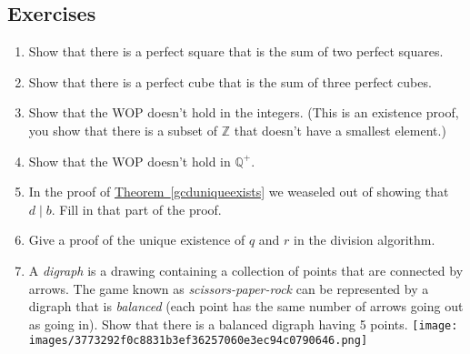 \documentclass[10pt,]{book}
\theoremstyle{plain}
\theoremstyle{definition}
\theoremstyle{definition}
\numberwithin{equation}{section}
\newcommand{\hint}[1]{ }
\newcommand{\divides}{\!\mid\!}
\newcommand{\Integers}{{\mathbb Z}}
\newcommand{\Rationals}{{\mathbb Q}}
\begin{document}
\subsection[{Exercises}]{Exercises}\label{exercises-20}
\leavevmode%
\begin{enumerate}[label=(\alph*)]
\item\hypertarget{li-286}{}
          Show that there is a perfect square that is the sum of two
          perfect squares.

          \hint{Can you say "Pythagorean triple"? I thought you could.}
\item\hypertarget{li-287}{}
          Show that there is a perfect cube that is the sum of three
          perfect cubes.

          \hint{Hint: \(6^3\) can be expressed as such a sum.}
\item\hypertarget{li-288}{}
          Show that the WOP doesn't hold in the integers.  (This is an
          existence proof, you show that there is a subset of \(\Integers\)
          that doesn't have a smallest element.)

          \hint{How about even integers? Is there a smallest one?  That's my example!  You come up with a 
          different one!}
\item\hypertarget{li-289}{}
          Show that the WOP doesn't hold in \(\Rationals^+\).

          \hint{Consider the set \(\{ 1, 1/2, 1/4, 1/8, \ldots \}\).  Does it have a smallest element?}
\item\hypertarget{li-290}{}
          In the proof of \hyperref[gcduniqueexists]{Theorem~\ref{gcduniqueexists}} we weaseled out of
          showing that \(d \divides b\).  Fill in that part of the proof.

          \hint{Yeah, I'm going to keep weaseling\dots{}}
\item\hypertarget{li-291}{}
          Give a proof of the unique existence of \(q\) and \(r\) in the
          division algorithm. 

          \hint{Unique existence proofs consist of two parts. First, just show existence. Then, show that if there were two of the things under consideration that they must in fact be equal.}
\item\hypertarget{li-292}{}
          A \emph{digraph} is a drawing containing a collection of points
          that are connected by arrows.  The game known as \emph{scissors-paper-rock}
          can be represented by a digraph that is \emph{balanced} (each point has the
          same number of arrows going out as going in).  Show that there is a 
          balanced digraph having 5 points.
          \texttt{[image: images/3773292f0c8831b3ef36257060e3ec94c0790646.png]}


\end{enumerate}
\end{document}
